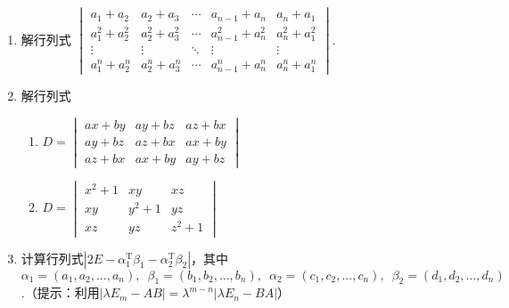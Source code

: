 \begin{enumerate}
\begin{enumerate}
 \end{enumerate}

    \item 解行列式 $\begin{vmatrix}
        a_{1}+a_{2}         & a_{2}+a_{3}         & \cdots & a_{n-1}+a_n         & a_n+a_{1}         \\
        a_{1}^{2}+a_{2}^{2} & a_{2}^{2}+a_{3}^{2} & \cdots & a_{n-1}^{2}+a_n^{2} & a_n^{2}+a_{1}^{2} \\
        \vdots              & \vdots              & \ddots & \vdots              & \vdots            \\
        a_{1}^{n}+a_{2}^{n} & a_{2}^{n}+a_{3}^{n} & \cdots & a_{n-1}^{n}+a_n^{n} & a_n^{n}+a_{1}^{n}
    \end{vmatrix}$.

    \item 解行列式
          \begin{multicols}{2} \begin{enumerate}
                  \item $D=\begin{vmatrix}
                                ax+by & ay+bz & az+bx \\
                                ay+bz & az+bx & ax+by \\
                                az+bx & ax+by & ay+bz
                            \end{vmatrix}$

                  \item $D=\begin{vmatrix}
                                x^2+1 & xy    & xz    \\
                                xy    & y^2+1 & yz    \\
                                xz    & yz    & z^2+1
                            \end{vmatrix}$
              \end{enumerate} \end{multicols}

    \item 计算行列式$|2E-\alpha_1^\mathrm{T}\beta_1-\alpha_2^\mathrm{T}\beta_2|$，其中$\alpha_1=(a_1,a_2,\ldots,a_n),\enspace \beta_1=(b_1,b_2,\ldots,b_n),\enspace \alpha_2=(c_1,c_2,\ldots,c_n),\enspace \beta_2 = (d_1,d_2,\ldots,d_n)$.（提示：利用$|\lambda E_m-AB|=\lambda^{m-n}|\lambda E_n-BA|$）

\end{enumerate}

